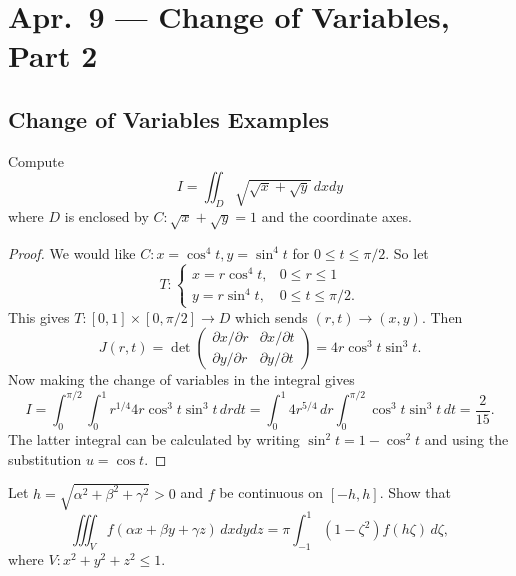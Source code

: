 \chapter{Apr.~9 --- Change of Variables, Part 2}

\section{Change of Variables Examples}
\begin{example}
  Compute
  \[
    I = \iint_D \sqrt{\sqrt{x} + \sqrt{y}}\, dxdy
  \]
  where $D$ is enclosed by $C : \sqrt{x} + \sqrt{y} = 1$
  and the coordinate axes.
\end{example}

\begin{proof}
  We would like $C : x = \cos^4 t, y = \sin^4 t$
  for $0 \le t \le \pi / 2$. So let
  \[
  T :
  \begin{cases}
    x = r \cos^4 t, & 0 \le r \le 1\\
    y = r \sin^4 t, & 0 \le t \le \pi / 2.
  \end{cases}
  \]
  This gives $T : [0, 1] \times [0, \pi / 2] \to D$
  which sends $(r, t) \to (x, y)$. Then
  \[
    J(r, t) = \det
    \begin{pmatrix}
      \partial x / \partial r & \partial x / \partial t\\
      \partial y / \partial r & \partial y / \partial t
    \end{pmatrix}
    = 4r \cos^3 t \sin^3 t.
  \]
  Now making the change of variables in the integral
  gives
  \[
    I = \int_0^{\pi / 2} \int_0^1 r^{1 / 4} 4r \cos^3 t \sin^3 t\, drdt
    = \int_0^1 4 r^{5 / 4}\, dr \int_0^{\pi / 2} \cos^3 t \sin^3 t\, dt
    = \frac{2}{15}.
  \]
  The latter integral can be calculated by writing
  $\sin^2 t = 1 - \cos^2 t$ and using the substitution
  $u = \cos t$.
\end{proof}

\begin{example}
  Let $h = \sqrt{\alpha^2 + \beta^2 + \gamma^2} > 0$
  and $f$ be continuous on $[-h, h]$. Show that
  \[
    \iiint_V f(\alpha x + \beta y + \gamma z)\, dx dy dz
    = \pi \int_{-1}^1 (1 - \zeta^2) f(h \zeta)\, d\zeta,
  \]
  where $V : x^2 + y^2 + z^2 \le 1$.
\end{example}

